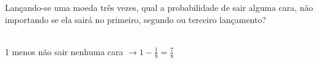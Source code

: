 \begin{ex}
Lançando-se uma moeda três vezes, qual a probabilidade de sair alguma cara, não  importando se ela sairá no primeiro, segundo ou terceiro lançamento?
  \begin{sol}
   \phantom{A} \\
   1 menos não sair nenhuma cara $\rightarrow 1-\frac{1}{8}=\frac{7}{8}$
  \end{sol}
\end{ex}
